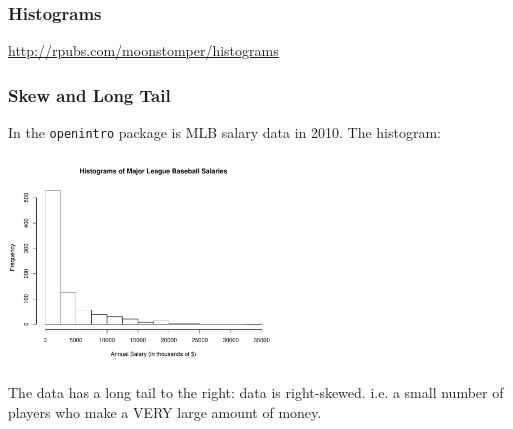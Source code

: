 \documentclass[handout]{beamer}
\newcommand{\blue}[1]{\textcolor{blue2}{#1}}
\begin{document}
\begin{frame}[fragile]
\frametitle{Histograms}

\blue{\url{http://rpubs.com/moonstomper/histograms}} 

\end{frame}



\begin{frame}[fragile]
\frametitle{Skew and Long Tail}
In the {\tt openintro} package is MLB salary data in 2010.  The histogram:

\begin{center}
\includegraphics[height=5.5cm]{figure/MLB.pdf}
\end{center}

\pause The data has a \blue{long tail} to the right: data is \blue{right-skewed}.  i.e. a small number of players who make a VERY large amount of money.  

\end{frame}
\end{document}
